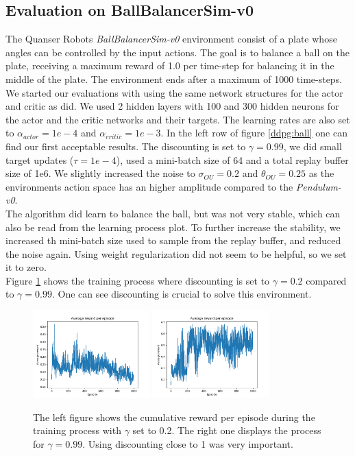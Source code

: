\subsection{Evaluation on BallBalancerSim-v0}
The Quanser Robots \textit{BallBalancerSim-v0} environment consist of a plate whose angles can be controlled by the input actions. The goal is to balance a ball on the plate, receiving a maximum reward of 1.0 per time-step for balancing it in the middle of the plate. The environment ends after a maximum of 1000 time-steps.\\
We started our evaluations with using the same network structures for the actor and critic as \cite{lillicrap2015continuous} did. We used 2 hidden layers with 100 and 300 hidden neurons for the actor and the critic networks and their targets. The learning rates are also set to $\alpha_{actor}=1e-4$ and $\alpha_{critic}=1e-3$. 
In the left row of figure \ref{ddpg:ball} one can find our first acceptable results. The discounting is set to $\gamma=0.99$, we did small target updates ($\tau=1e-4$), used a mini-batch size of 64 and a total replay buffer size of 1e6. We slightly increased the noise to $\sigma_{OU}=0.2$ and $\theta_{OU}=0.25$ as the environments action space has an higher amplitude compared to the \textit{Pendulum-v0}.\\
The algorithm did learn to balance the ball, but was not very stable, which can also be read from the learning process plot. To further increase the stability, we increased th mini-batch size used to sample from the replay buffer, and reduced the noise again. Using weight regularization did not seem to be helpful, so we set it to zero.\\
Figure \ref{ddpg:ball:gamma} shows the training process where discounting is set to $\gamma=0.2$ compared to $\gamma=0.99$. One can see discounting is crucial to solve this environment.\\
\begin{figure}[H]
	\centering
	\includegraphics[width=0.4\textwidth]{plots/ddpg_ball_low_gamma.png}
	\includegraphics[width=0.4\textwidth]{plots/ddpg_ball_high_gamma.png}
	\caption{The left figure shows the cumulative reward per episode during the training process with $\gamma$ set to 0.2. The right one displays the process for $\gamma=0.99$. Using discounting close to 1 was very important.}
	\label{ddpg:ball:gamma}
\end{figure}

